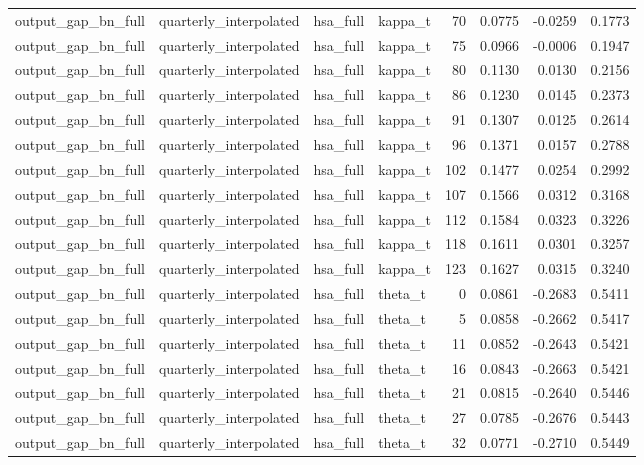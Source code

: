 \begin{tabular}{llllrrrr}
output\_gap\_bn\_full & quarterly\_interpolated & hsa\_full & kappa\_t & 70 & 0.0775 & -0.0259 & 0.1773 \\
output\_gap\_bn\_full & quarterly\_interpolated & hsa\_full & kappa\_t & 75 & 0.0966 & -0.0006 & 0.1947 \\
output\_gap\_bn\_full & quarterly\_interpolated & hsa\_full & kappa\_t & 80 & 0.1130 & 0.0130 & 0.2156 \\
output\_gap\_bn\_full & quarterly\_interpolated & hsa\_full & kappa\_t & 86 & 0.1230 & 0.0145 & 0.2373 \\
output\_gap\_bn\_full & quarterly\_interpolated & hsa\_full & kappa\_t & 91 & 0.1307 & 0.0125 & 0.2614 \\
output\_gap\_bn\_full & quarterly\_interpolated & hsa\_full & kappa\_t & 96 & 0.1371 & 0.0157 & 0.2788 \\
output\_gap\_bn\_full & quarterly\_interpolated & hsa\_full & kappa\_t & 102 & 0.1477 & 0.0254 & 0.2992 \\
output\_gap\_bn\_full & quarterly\_interpolated & hsa\_full & kappa\_t & 107 & 0.1566 & 0.0312 & 0.3168 \\
output\_gap\_bn\_full & quarterly\_interpolated & hsa\_full & kappa\_t & 112 & 0.1584 & 0.0323 & 0.3226 \\
output\_gap\_bn\_full & quarterly\_interpolated & hsa\_full & kappa\_t & 118 & 0.1611 & 0.0301 & 0.3257 \\
output\_gap\_bn\_full & quarterly\_interpolated & hsa\_full & kappa\_t & 123 & 0.1627 & 0.0315 & 0.3240 \\
output\_gap\_bn\_full & quarterly\_interpolated & hsa\_full & theta\_t & 0 & 0.0861 & -0.2683 & 0.5411 \\
output\_gap\_bn\_full & quarterly\_interpolated & hsa\_full & theta\_t & 5 & 0.0858 & -0.2662 & 0.5417 \\
output\_gap\_bn\_full & quarterly\_interpolated & hsa\_full & theta\_t & 11 & 0.0852 & -0.2643 & 0.5421 \\
output\_gap\_bn\_full & quarterly\_interpolated & hsa\_full & theta\_t & 16 & 0.0843 & -0.2663 & 0.5421 \\
output\_gap\_bn\_full & quarterly\_interpolated & hsa\_full & theta\_t & 21 & 0.0815 & -0.2640 & 0.5446 \\
output\_gap\_bn\_full & quarterly\_interpolated & hsa\_full & theta\_t & 27 & 0.0785 & -0.2676 & 0.5443 \\
output\_gap\_bn\_full & quarterly\_interpolated & hsa\_full & theta\_t & 32 & 0.0771 & -0.2710 & 0.5449 \\

\end{tabular}
